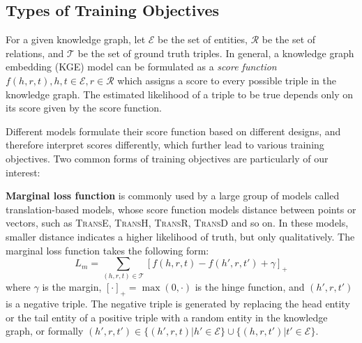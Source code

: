\documentclass[11pt,a4paper]{article}
\begin{document}
\subsection{Types of Training Objectives}
For a given knowledge graph, let $\mathcal{E}$ be the set of entities, $\mathcal{R}$ be the set of relations, and $\mathcal{T}$ be the set of ground truth triples.
In general, a knowledge graph embedding (KGE) model can be formulated as a \emph{score function} $f(h,r,t), h,t\in\mathcal{E}, r\in \mathcal{R}$ which assigns a score to every possible triple in the knowledge graph. The estimated likelihood of a triple to be true depends only on its score given by the score function.

Different models formulate their score function based on different designs, and therefore interpret scores differently, which further lead to various training objectives. Two common forms of training objectives are particularly of our interest:

\noindent \textbf{Marginal loss function} is commonly used by a large group of models called translation-based models, whose score function models distance between points or vectors, such as \textsc{TransE}, \textsc{TransH}, \textsc{TransR}, \textsc{TransD} and so on. In these models, smaller distance indicates a higher likelihood of truth, but only qualitatively.
The marginal loss function takes the following form:
\begin{equation}
L_{m}=\sum_{(h,r,t)\in\mathcal{T}}[f(h,r,t)-f(h',r,t')+\gamma]_+\label{eq:marginalloss}
\end{equation}
where $\gamma$ is the margin, $[\cdot]_+=\max(0,\cdot)$ is the hinge function, and $(h',r,t')$ is a negative triple. The negative triple is generated by replacing the head entity or the tail entity of a positive triple with a random entity in the knowledge graph, or formally $(h',r,t')\in\{(h',r,t)|h'\in\mathcal{E}\}\cup\{(h,r,t')|t'\in\mathcal{E}\}$.
\end{document}

